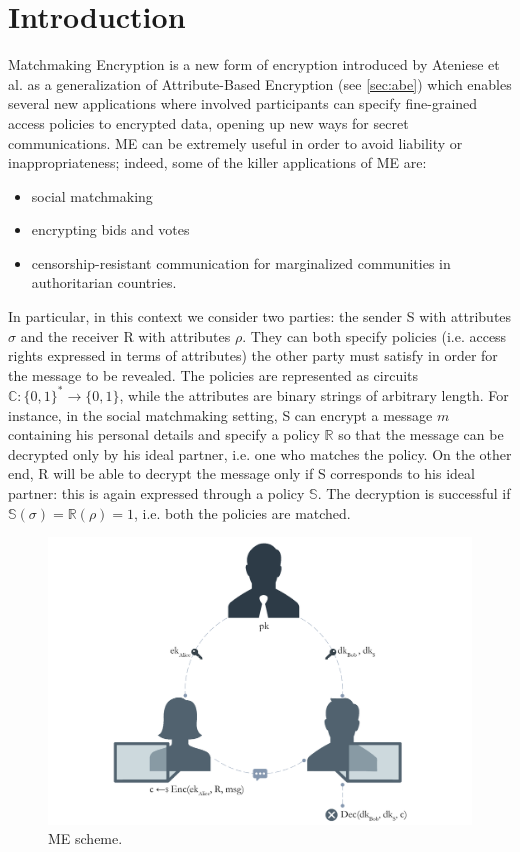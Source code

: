 \chapter{Introduction}
Matchmaking Encryption is a new form of encryption introduced by Ateniese et al. \cite{Ateniese} as a generalization of Attribute-Based Encryption (see \ref{sec:abe}) which enables several new applications where involved participants can specify fine-grained access policies to encrypted data, opening up new ways for secret communications.
\newline\newline
ME can be extremely useful in order to avoid liability or inappropriateness; indeed, some of the killer applications of ME are:
\begin{itemize}
    \item social matchmaking
    \item encrypting bids and votes
    \item censorship-resistant communication for marginalized communities in authoritarian countries.
\end{itemize}
In particular, in this context we consider two parties: the sender S with attributes $\sigma$ and the receiver R with attributes $\rho$.
They can both specify policies (i.e. access rights expressed in terms of attributes) the other party must satisfy in order for the message to be revealed.
The policies are represented as circuits $\mathbb{C} : \{0, 1\}^* \to \{0, 1\}$, while the attributes are binary strings of arbitrary length.
For instance, in the social matchmaking setting, S can encrypt a message $m$ containing his personal details and specify a policy $\mathbb{R}$ so that the message can be decrypted only by his ideal partner, i.e. one who matches the policy.
On the other end, R will be able to decrypt the message only if S corresponds to his ideal partner: this is again expressed through a policy $\mathbb{S}$. The decryption is successful if $\mathbb{S}(\sigma) = \mathbb{R}(\rho) = 1$, i.e. both the policies are matched.

\begin{figure}[ht]
    \centering
    \includegraphics[width=\linewidth]{images/me.png}
    \caption{ME scheme.}
    \label{fig:me_example}
\end{figure}

